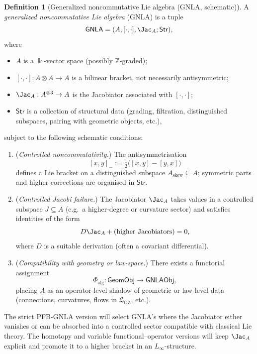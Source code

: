 \documentclass[11pt]{book}
\theoremstyle{plain}
\theoremstyle{definition}
\newtheorem{definition}[theorem]{Definition} \theoremstyle{remark}
\newcommand{\GZLS}{\ensuremath{\mathfrak{L}_{\mathrm{GZ}}}}       \newcommand{\GZLT}{\ensuremath{M_{!w}}}                           \newcommand{\GZLOC}{\ensuremath{A_M}}                             \newcommand{\GZLCurv}{\ensuremath{\mathcal{F}_{\mathrm{law}}}}
\begin{document}
\begin{definition}[Generalized noncommutative Lie algebra (GNLA, schematic)]
A \emph{generalized noncommutative Lie algebra} (GNLA) is a tuple
  \[
     \mathsf{GNLA}
     =
     (A,[\cdot,\cdot],\Jac_A;\mathsf{Str}),
  \]
  where
  \begin{itemize}
    \item $A$ is a $\Bbbk$-vector space (possibly $\mathbb{Z}$-graded);
    \item $[\cdot,\cdot]:A\otimes A\to A$ is a bilinear bracket, not
          necessarily antisymmetric;
    \item $\Jac_A:A^{\otimes 3}\to A$ is the Jacobiator associated
          with $[\cdot,\cdot]$;
    \item $\mathsf{Str}$ is a collection of structural data (grading,
          filtration, distinguished subspaces, pairing with geometric
          objects, etc.),
  \end{itemize}
  subject to the following schematic conditions:
  \begin{enumerate}[label=\roman*)]
    \item (\emph{Controlled noncommutativity.})
          The antisymmetrisation
          \[
             [x,y]_- := \tfrac12\bigl([x,y]-[y,x]\bigr)
          \]
          defines a Lie bracket on a distinguished subspace
          $A_{\mathrm{skew}}\subseteq A$; symmetric parts and higher
          corrections are organised in $\mathsf{Str}$.
    \item (\emph{Controlled Jacobi failure.})
          The Jacobiator $\Jac_A$ takes values in a controlled
          subspace $J\subseteq A$ (e.g.\ a higher-degree or curvature
          sector) and satisfies identities of the form
          \[
             D\Jac_A + \text{(higher Jacobiators)} = 0,
          \]
          where $D$ is a suitable derivation (often a covariant
          differential).
    \item (\emph{Compatibility with geometry or law-space.})
          There exists a functorial assignment
          \[
             \Phi_{\mathrm{alg}}:
               \mathsf{GeomObj}
               \longrightarrow
               \mathsf{GNLAObj},
          \]
          placing $A$ as an operator-level shadow of geometric or
          law-level data (connections, curvatures, flows in \GZLS,
          etc.).
  \end{enumerate}
\end{definition}

The strict PFB-GNLA version will select GNLA’s where the Jacobiator
either vanishes or can be absorbed into a controlled sector compatible
with classical Lie theory. The homotopy and variable functional–operator
versions will keep $\Jac_A$ explicit and promote it to a higher bracket
in an $L_\infty$-structure.
\end{document}
